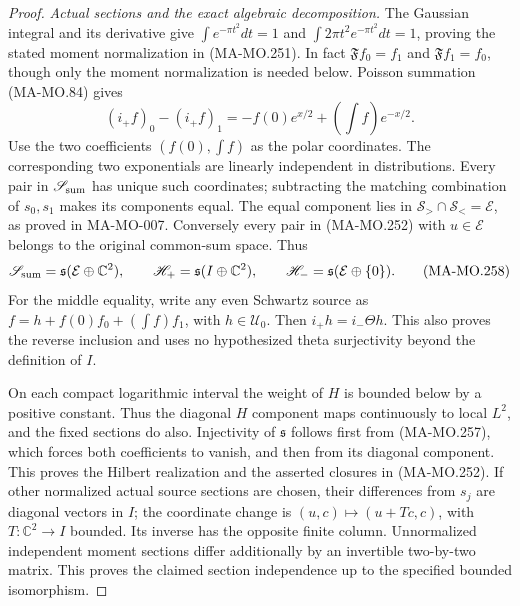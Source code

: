 \begin{proof}
\emph{Actual sections and the exact algebraic decomposition.}
The Gaussian integral and its derivative give
\(\int e^{-\pi t^2}dt=1\) and
\(\int2\pi t^2e^{-\pi t^2}dt=1\), proving the stated
moment normalization in (MA-MO.251). In fact
\(\mathfrak Ff_0=f_1\) and \(\mathfrak Ff_1=f_0\),
though only the moment normalization is needed below.
Poisson summation (MA-MO.84) gives
\[
 (i_+f)_0-(i_+f)_1
      =-f(0)e^{x/2}+\left(\int f\right)e^{-x/2}.
 \tag{MA-MO.257}
\]
Use the two coefficients \((f(0),\int f)\) as the polar
coordinates. The corresponding two exponentials are linearly
independent in distributions. Every pair in
\(\mathscr S_{\rm sum}\) has unique such coordinates;
subtracting the matching combination of \(s_0,s_1\)
makes its components equal. The equal component lies in
\(\mathcal S_>\cap\mathcal S_<=\mathcal E\), as proved
in MA-MO-007. Conversely every pair in (MA-MO.252) with
\(u\in\mathcal E\) belongs to the original common-sum
space. Thus
\[
 \mathscr S_{\rm sum}=\mathfrak s(\mathcal E\oplus\mathbb C^2),
 \qquad
 \mathscr H_+=\mathfrak s(I\oplus\mathbb C^2),
 \qquad
 \mathscr H_-=\mathfrak s(\mathcal E\oplus\{0\}).
 \tag{MA-MO.258}
\]
For the middle equality, write any even Schwartz source as
\(f=h+f(0)f_0+(\int f)f_1\), with \(h\in\mathscr U_0\).
Then \(i_+h=i_-\Theta h\). This also proves the reverse
inclusion and uses no hypothesized theta surjectivity beyond
the definition of \(I\).

On each compact logarithmic interval the weight of \(H\)
is bounded below by a positive constant. Thus the diagonal
\(H\) component maps continuously to local \(L^2\), and
the fixed sections do also. Injectivity of \(\mathfrak s\)
follows first from (MA-MO.257), which forces both coefficients
to vanish, and then from its diagonal component. This proves
the Hilbert realization and the asserted closures in
(MA-MO.252). If other normalized actual source sections are
chosen, their differences from \(s_j\) are diagonal vectors
in \(I\); the coordinate change is
\((u,c)\mapsto(u+Tc,c)\), with \(T:\mathbb C^2\to I\)
bounded. Its inverse has the opposite finite column.
Unnormalized independent moment sections differ additionally
by an invertible two-by-two matrix. This proves the claimed
section independence up to the specified bounded isomorphism.


\end{proof}
